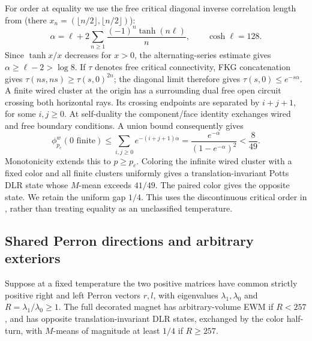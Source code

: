 For order at equality we use the free critical diagonal inverse correlation length from \cite[Theorem~1.2(3)]{dghmt} (there \(x_n=(\lfloor n/2\rfloor,\lfloor n/2\rfloor)\)):
\[
\alpha=\ell+2\sum_{n\ge1}\frac{(-1)^n\tanh(n\ell)}n,
\qquad\cosh\ell=128.
\]
Since \(\tanh x/x\) decreases for \(x>0\), the alternating-series estimate gives \(\alpha\ge\ell-2>\log8\). If \(\tau\) denotes free critical connectivity, FKG concatenation gives \(\tau(ns,ns)\ge\tau(s,0)^{2n}\); the diagonal limit therefore gives \(\tau(s,0)\le e^{-s\alpha}\). A finite wired cluster at the origin has a surrounding dual free open circuit crossing both horizontal rays. Its crossing endpoints are separated by \(i+j+1\), for some \(i,j\ge0\). At self-duality the component/face identity exchanges wired and free boundary conditions. A union bound consequently gives
\[
\phi^w_{p_c}(0\text{ finite})\le
\sum_{i,j\ge0}e^{-(i+j+1)\alpha}
=\frac{e^{-\alpha}}{(1-e^{-\alpha})^2}<\frac8{49}.
\]
Monotonicity extends this to \(p\ge p_c\). Coloring the infinite wired cluster with a fixed color and all finite clusters uniformly gives a translation-invariant Potts DLR state whose \(M\)-mean exceeds \(41/49\). The paired color gives the opposite state. We retain the uniform gap \(1/4\). This uses the discontinuous critical order in \cite{dghmt}, rather than treating equality as an unclassified temperature.

\subsection{Shared Perron directions and arbitrary exteriors}

\begin{lemma}\label{lem:line-transfer}
Suppose at a fixed temperature the two positive matrices have common strictly positive right and left Perron vectors \(r,l\), with eigenvalues \(\lambda_1,\lambda_0\) and \(R=\lambda_1/\lambda_0\ge1\). The full decorated magnet has arbitrary-volume EWM if \(R<257\), and has opposite translation-invariant DLR states, exchanged by the color half-turn, with \(M\)-means of magnitude at least \(1/4\) if \(R\ge257\).
\end{lemma}

